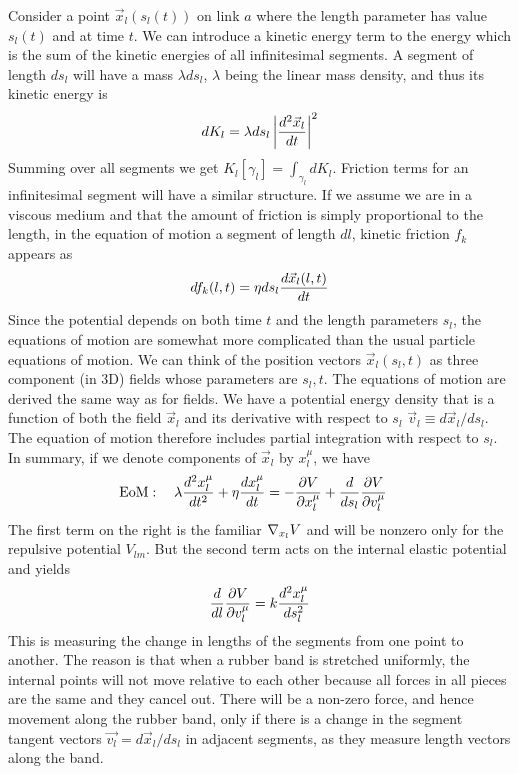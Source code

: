 \documentclass[nofootinbib,preprint,floatfix,titlepage,superscriptaddress]{revtex4} %
\begin{document}
Consider a point $\vec{x}_l(s_l(t))$ on link $a$ where the length parameter has value $s_l(t)$ and at time $t$. We can introduce a kinetic energy term to the energy which is the sum of the kinetic energies of all infinitesimal segments.
A segment of length $ds_l$ will have a mass $\lambda ds_l $, $\lambda$ being the linear mass density, and thus its kinetic energy is
\[dK_l = \lambda ds_l \left|d^2 \vec{x}_l \over dt \right|^2\]
Summing over all segments we get $K_l[\gamma_l] = \int_{\gamma_l} dK_l$. Friction terms for an infinitesimal segment will have a similar structure. If we assume we are in a viscous medium and that the amount of friction is simply proportional to the length, in the equation of motion a segment of length $dl$, kinetic friction $f_k$ appears as 
\[df_k(l,t) =\eta ds_l {d\vec{x}_l(l,t)\over dt}\] 
Since the potential depends on both time $t$ and the length parameters $s_l$, the equations of motion are somewhat more complicated than the usual particle equations of motion. 
We can think of the position vectors $\vec{x}_l (s_l,t)$ as three component (in 3D) fields whose parameters are $s_l,t$. 
The equations of motion are derived the same way as for fields. 
We have a potential energy density that is a function of both the field $\vec{x}_l$ and its derivative with respect to $s_l$  $\vec{v}_l \equiv d\vec{x}_l/ds_l$. 
The equation of motion therefore includes partial integration with respect to $s_l$. 
In summary, if we denote components of $\vec{x}_l$ by $x_l^\mu$, we have 
\begin{align}
    \mbox{EoM}:\quad \lambda {d^2 x_l^\mu \over dt^2} +\eta {dx_l^\mu \over dt} & =  -{\partial V \over \partial x_l^\mu} + {d\over ds_l} {\partial V \over \partial v_l^\mu}   \label{eq:Langevin}
\end{align}
The first term on the right is the familiar $\nabla_{x_l} V$ and will be nonzero only for the repulsive potential $V_{lm}$. But the second term acts on the internal elastic potential and yields \[{d\over dl} {\partial V \over \partial v_l^\mu} = k {d^2 x_l^\mu \over ds_l^2}\]  
This is measuring the change in lengths of the segments from one point to another. The reason is that when a rubber band is stretched uniformly, the internal points will not move relative to each other because all forces in all pieces are the same and they cancel out. There will be a non-zero force, and hence movement along the rubber band, only if there is a change in the segment tangent vectors $\vec{v_l} = d\vec{x}_l/ds_l$ in adjacent segments, as they measure length vectors along the band.
\end{document}
